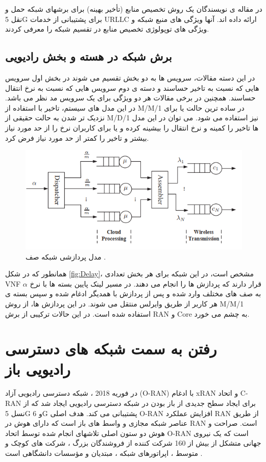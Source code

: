 در مقاله ی
\cite{li2019latency}
نویسندگان یک روش تخصیص منابع (تأخیر بهینه) برای برشهای شبکه حمل و نقل 5G برای پشتیبانی از خدمات URLLC ارائه داده اند.
آنها ویژگی های منبع شبکه و ویژگی های توپولوژی تخصیص منابع در تقسیم شبکه را معرفی کردند.
\subsection{برش شبکه در هسته و بخش رادیویی}
در این دسته مقالات، سرویس ها به دو بخش تقسیم می شوند در بخش اول سرویس هایی که  نسبت به تاخیر حساسند و دسته ی دوم سرویس هایی که نسبت به نرخ انتقال حساسند. همچنین در برخی مقالات هر دو ویژگی برای یک سرویس مد نظر می باشد.
در این مدل های سیستم، تاخیر با استفاده از M/M/1 در ساده ترین حالت یا برای نزدیک تر شدن به حالت حقیقی از M/D/1 نیز استفاده می شود. می توان در این مدل ها تاخیر را کمینه و نرخ انتقال را بیشینه کرده و یا 
برای کاربران نرخ را از حد مورد نیاز بیشتر و تاخیر را کمتر از حد مورد نیاز فرض کرد\cite{frdl,luong2018novel,luong2018novel1,guo2016exploiting}.
 \begin{figure}[H]
  \centering
    \includegraphics[scale = 0.7]{./fig/Delay}
  \caption{مدل پردازشی شبکه صف \cite{frdl}.}
  \label{fig:Delay}
\end{figure}
همانطور که در شکل \eqref{fig:Delay}، مشخص است، در این شبکه برای هر بخش تعدادی VNF قرار دارند که پردازش ها را انجام می دهند. در مسیر لینک پایین
بسته ها با نرخ $\alpha$ به صف های مختلف وارد شده و پس از پردازش با همدیگر ادغام شده و سپس بسته ی هر کاربر از طریق وایرلس منتقل می شوند.
در این پردازش ها، از روش M/M/1 استفاده شده است.
در این حالات ترکیبی از برش RAN و Core به چشم می خورد.
\section{رفتن به سمت شبکه های دسترسی رادیویی باز}
در فوریه 2018 ، شبکه دسترسی رادیویی آزاد (O-RAN) با ادغام  xRAN و اتحاد C-RAN برای ایجاد سطح جدیدی از باز بودن در شبکه دسترسی رادیویی ایجاد شد که از نسل 5G و 6G پشتیبانی می کند.
هدف اصلی O-RAN افزایش عملکرد RAN از طریق عناصر شبکه مجازی و واسط های باز است که دارای هوش در RAN است.
صراحت و هوش دو ستون اصلی تلاشهای انجام شده توسط اتحاد O-RAN است که یک نیروی جهانی متشکل از بیش از 160 شرکت کننده از فروشندگان بزرگ ، شرکت های کوچک و متوسط ، اپراتورهای شبکه ، مبتدیان و مؤسسات دانشگاهی است
\cite{oranpaper}
.


